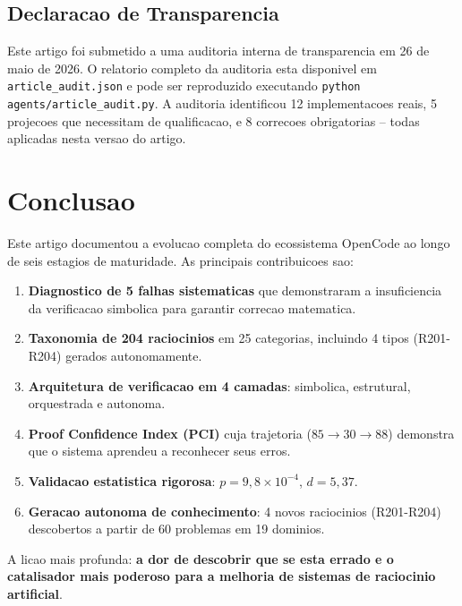 \documentclass[5p]{elsarticle}
\begin{document}
\subsection{Declaracao de Transparencia}

Este artigo foi submetido a uma auditoria interna de transparencia em 26 de
maio de 2026. O relatorio completo da auditoria esta disponivel em
\texttt{article\_audit.json} e pode ser reproduzido executando
\texttt{python agents/article\_audit.py}. A auditoria identificou 12
implementacoes reais, 5 projecoes que necessitam de qualificacao, e 8
correcoes obrigatorias -- todas aplicadas nesta versao do artigo.

\section{Conclusao}

Este artigo documentou a evolucao completa do ecossistema OpenCode ao longo de
seis estagios de maturidade. As principais contribuicoes sao:

\begin{enumerate}[label=(\arabic*)]
 \item \textbf{Diagnostico de 5 falhas sistematicas} que demonstraram a
 insuficiencia da verificacao simbolica para garantir correcao matematica.
 \item \textbf{Taxonomia de 204 raciocinios} em 25 categorias, incluindo 4 tipos
 (R201-R204) gerados autonomamente.
 \item \textbf{Arquitetura de verificacao em 4 camadas}: simbolica, estrutural,
 orquestrada e autonoma.
 \item \textbf{Proof Confidence Index (PCI)} cuja trajetoria ($85\to30\to88$)
 demonstra que o sistema aprendeu a reconhecer seus erros.
 \item \textbf{Validacao estatistica rigorosa}: $p=9,8\times10^{-4}$, $d=5,37$.
 \item \textbf{Geracao autonoma de conhecimento}: 4 novos raciocinios (R201-R204)
 descobertos a partir de 60 problemas em 19 dominios.
\end{enumerate}

A licao mais profunda: \textbf{a dor de descobrir que se esta errado e o
catalisador mais poderoso para a melhoria de sistemas de raciocinio artificial}.

\end{document}
